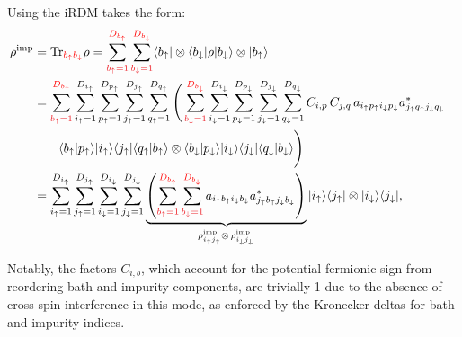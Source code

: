 \documentclass[edipack_sp.tex]{subfiles}
\begin{document}
Using  the iRDM takes the form:
\begin{equation}
  \label{iRDMnormal}
  \begin{aligned}
  \rho^\mathrm{imp} &= \Tr_{{\color{red}b_\up b_\dw}}{\rho} = 
  \sum_{{\color{Red} b_\up=1}}^{{\color{red} D_{b_\up}}}
  \sum_{{\color{Red} b_\dw=1}}^{{\color{red} D_{b_\dw}}}
  \bra{b_\up}\otimes\bra{b_\dw}
    \rho
    \ket{b_\dw}\otimes\ket{b_\up}    \cr
    &=
    \sum_{{\color{Red} b_\up=1}}^{{\color{red} D_{b_\up}}}
    \sum_{i_\up=1}^{D_{i_\up}}
    \sum_{p_\up=1}^{D_{p_\up}}
    \sum_{j_\up=1}^{D_{j_\up}} 
    \sum_{q_\up=1}^{D_{q_\up}}
    \Bigg(    
    \sum_{{\color{Red} b_\dw=1}}^{{\color{red} D_{b_\dw}}}
    \sum_{i_\dw=1}^{D_{i_\dw}}
    \sum_{p_\dw=1}^{D_{p_\dw}}
    \sum_{j_\dw=1}^{D_{j_\dw}} 
    \sum_{q_\dw=1}^{D_{q_\dw}}
    C_{i,p}\,C_{j,q}\,a_{i_\up p_\up i_\dw p_\dw} a^*_{j_\up q_\up j_\dw q_\dw} \cr
    &\qquad    
    \langle b_\up| p_\up\rangle| i_\up\rangle\langle j_\up |\langle q_\up| b_\up\rangle   \otimes \langle b_\dw| p_\dw \rangle|i_\dw\rangle \langle j_\dw  |\langle q_\dw| b_\dw\rangle \Bigg)
    \cr
&=
    \sum_{i_\up=1}^{D_{i_\up}}
    \sum_{j_\up=1}^{D_{j_\up}}
    \sum_{i_\dw=1}^{D_{i_\dw}}
    \sum_{j_\dw=1}^{D_{j_\dw}}
    \underbrace{\left(
    \sum_{{\color{Red} b_\up=1}}^{{\color{red} D_{b_\up}}}
    \sum_{{\color{Red} b_\dw=1}}^{{\color{red} D_{b_\dw}}}
    a_{i_\up b_\up i_\dw b_\dw} a^*_{j_\up b_\up j_\dw b_\dw}
    \right)}_{\rho^\mathrm{imp}_{i_\up j_\up} \otimes\, \rho^\mathrm{imp}_{i_\dw j_\dw} }
    \ket{i_\up}\bra{j_\up}\otimes \ket{i_\dw}\bra{j_\dw},
  \end{aligned}
\end{equation}

Notably, the factors $C_{i,b}$, which account for the potential 
fermionic sign from reordering bath and impurity components, are 
trivially 1 due to the absence of cross-spin interference in this 
mode, as enforced by the Kronecker deltas for bath and impurity 
indices.
\end{document}
